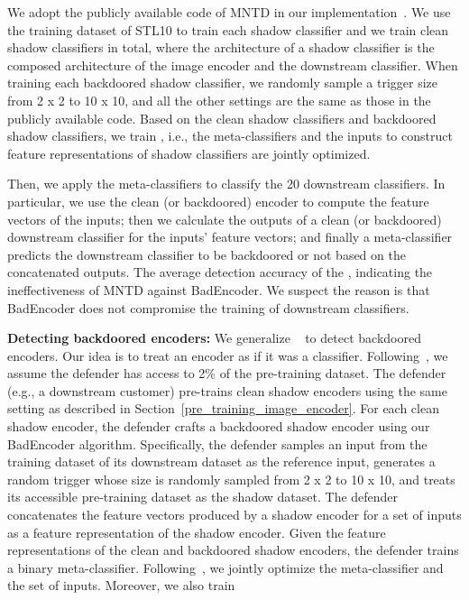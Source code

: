 We adopt the publicly available code of MNTD in our implementation~\cite{mntd_url}.  We use the training dataset of STL10 to train each shadow classifier and we train  clean shadow classifiers in total, where the architecture of a shadow classifier is the composed architecture of the image encoder and the downstream classifier.   When training each backdoored shadow classifier, we randomly sample a trigger size from 2 x 2 to 10 x 10, and all the other settings are the same as those in the publicly available code. Based on the  clean shadow classifiers and  backdoored shadow classifiers, we train  , i.e., the meta-classifiers and the inputs to construct feature representations of shadow classifiers are jointly optimized. 

Then, we apply the meta-classifiers to classify the 20 downstream classifiers. In particular, we use the clean (or backdoored) encoder to compute the feature vectors of the inputs; then we calculate the outputs of a clean (or backdoored) downstream classifier for the inputs’ feature vectors; and finally a meta-classifier predicts the downstream classifier to be backdoored or not based on the concatenated outputs. The
average detection accuracy of the , indicating the ineffectiveness of MNTD against BadEncoder. We suspect the reason is that BadEncoder does not compromise the training of downstream classifiers. 

\noindent
{\bf Detecting backdoored encoders:}
We generalize ~\cite{xu2019detecting} to detect backdoored encoders. Our idea is to treat an encoder as if it was a classifier. Following~\cite{xu2019detecting}, we assume the defender has access to 2\% of the pre-training dataset. The defender (e.g., a downstream customer) pre-trains  clean shadow encoders using the same setting as described in Section~\ref{pre_training_image_encoder}. For each clean shadow encoder, the defender crafts a backdoored shadow encoder using our BadEncoder algorithm. Specifically, the defender samples an input from the training dataset of its downstream dataset as the reference input, generates a random trigger whose size is randomly sampled from 2 x 2 to 10 x 10, and treats its accessible pre-training dataset as the shadow dataset. The defender concatenates the feature vectors produced by a shadow encoder for a set of inputs as a feature representation of the shadow encoder. Given the feature representations of the  clean and  backdoored shadow encoders, the defender trains a binary meta-classifier. Following~\cite{xu2019detecting}, we jointly optimize the meta-classifier and the set of inputs. Moreover, we also train 

